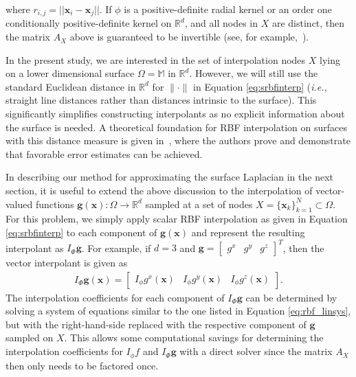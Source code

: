 \documentclass[smallextended]{svjour3}
\newcommand{\vX}{ \mathbf{x} }
\newcommand{\vg}{ \mathbf{g} }
\begin{document}
%
where $r_{i,j} = ||\vX_i - \vX_j||$. If $\phi$ is a positive-definite radial kernel or an order one conditionally positive-definite kernel on $\mathbb{R}^d$, and all nodes in $X$ are distinct, then the matrix $A_{X}$ above is guaranteed to be invertible (see, for example,~\cite[Ch.\ 6--8]{Wendland:2004}). 

In the present study, we are interested in the set of interpolation nodes $X$ lying on a lower dimensional surface $\Omega=\mathbb{M}$ in $\mathbb{R}^d$.  However, we will still use the standard Euclidean distance in $\mathbb{R}^d$  for $\| \cdot \|$ in Equation \eqref{eq:srbfinterp} (\emph{i.e.,} straight line distances rather than distances intrinsic to the surface).  This significantly simplifies constructing interpolants as no explicit information about the surface is needed.  A theoretical foundation for RBF interpolation on surfaces with this distance measure is given in~\cite{FuselierWright:2010}, where the authors prove and demonstrate that favorable error estimates can be achieved.

In describing our method for approximating the surface Laplacian in the next section, it is useful to extend the above discussion to the interpolation of vector-valued functions $\vg(\vX): \Omega \to \mathbb{R}^d$ sampled at a set of nodes $X = \{\vX_k\}_{k = 1}^N \subset \Omega$. For this problem, we simply apply scalar RBF interpolation as given in Equation \eqref{eq:srbfinterp} to each component of $\vg(\vX)$ and represent the resulting interpolant as $I_{\Phi}\vg$.  For example, if $d=3$ and $\vg = \begin{bmatrix} g^x & g^y & g^z \end{bmatrix}^T$, then the vector interpolant is given as
\begin{align}
I_{\Phi} \vg(\vX) = \begin{bmatrix} I_{\phi} g^x(\vX) & I_{\phi} g^y(\vX) & I_{\phi} g^z(\vX) \end{bmatrix}.
\label{eq:vrbfinterp}
\end{align}
The interpolation coefficients for each component of $I_{\Phi} \vg$ can be determined by solving a system of equations similar to the one listed in Equation \eqref{eq:rbf_linsys}, but with the right-hand-side replaced with the respective component of $\vg$ sampled on $X$.  This allows some computational savings for determining the interpolation coefficients for $I_{\phi} f$ and $I_{\Phi} \vg$ with a direct solver since the matrix $A_{X}$ then only needs to be factored once.
\end{document}
